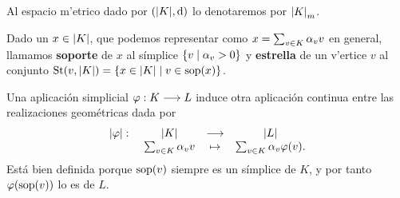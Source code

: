 Al espacio m'etrico dado por $(\abs{K},\dd)$ lo denotaremos por $\abs{K}_m$.

\begin{definition}
  Dado un $ x\in \abs{K} $, que podemos representar como $ x = \sum_{v\in K}\alpha_v v $ en general, llamamos \textbf{soporte} de $ x $ al símplice $ \{v\mid \alpha_v>0\} $ y \textbf{estrella} de un v'ertice $v$ al conjunto $\operatorname{St}(v,\abs{K}) = \{x\in \abs{K}\mid v\in \operatorname{sop}(x)\}$.
\end{definition}

\begin{observation}
  Una aplicación simplicial $ \varphi:K\longrightarrow L $ induce otra aplicación continua entre las realizaciones geométricas dada por 
  \begin{gather*}
    \begin{matrix}
    \abs{\varphi}: \ &\abs{K} &\longrightarrow &\abs{L} \\
    &\sum_{v\in K}\alpha_v v &\mapsto &\sum_{v\in K}\alpha_v \varphi(v).
    \end{matrix}
  \end{gather*}
  Está bien definida porque $\operatorname{sop}(v) $ siempre es un símplice de $ K $, y por tanto $ \varphi(\operatorname{sop}(v)) $ lo es de $ L $.
\end{observation}



